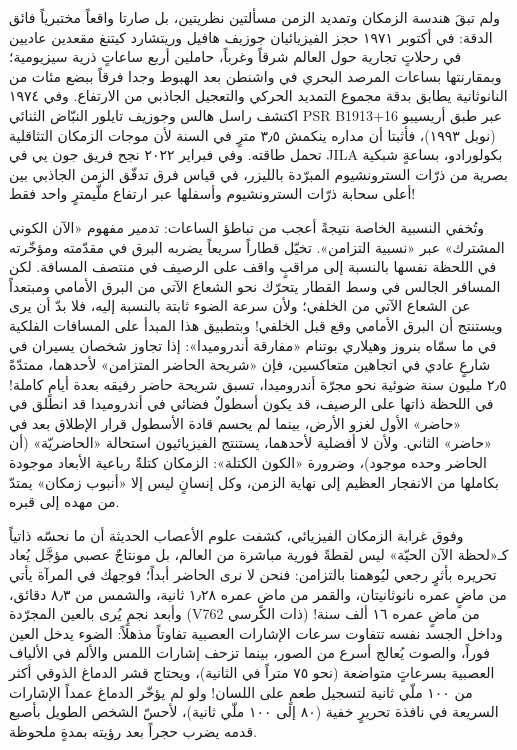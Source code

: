 \documentclass[12pt,a4paper,openany]{book}
\begin{document}
ولم تبقَ هندسة الزمكان وتمديد الزمن مسألتين نظريتين، بل صارتا واقعاً مختبرياً فائق الدقة: في أكتوبر ١٩٧١ حجز الفيزيائيان جوزيف هافيل وريتشارد كيتنغ مقعدين عاديين في رحلاتٍ تجارية حول العالم شرقاً وغرباً، حاملين أربع ساعاتٍ ذرية سيزيومية؛ وبمقارنتها بساعات المرصد البحري في واشنطن بعد الهبوط وجدا فرقاً ببضع مئات من النانوثانية يطابق بدقة مجموع التمديد الحركي والتعجيل الجاذبي من الارتفاع. وفي ١٩٧٤ اكتشف راسل هالس وجوزيف تايلور النبّاض الثنائي PSR B1913+16 عبر طبق أريسيبو (نوبل ١٩٩٣)، فأثبتا أن مداره ينكمش ٣٫٥ مترٍ في السنة لأن موجات الزمكان التثاقلية تحمل طاقته. وفي فبراير ٢٠٢٢ نجح فريق جون يي في JILA بكولورادو، بساعةٍ شبكية بصرية من ذرّات السترونشيوم المبرّدة بالليزر، في قياس فرق تدفّق الزمن الجاذبي بين أعلى سحابة ذرّات السترونشيوم وأسفلها عبر ارتفاع ملّيمترٍ واحد فقط!


وتُخفي النسبية الخاصة نتيجةً أعجب من تباطؤ الساعات: تدمير مفهوم «الآن الكوني المشترك» عبر «نسبية التزامن». تخيّل قطاراً سريعاً يضربه البرق في مقدّمته ومؤخّرته في اللحظة نفسها بالنسبة إلى مراقبٍ واقف على الرصيف في منتصف المسافة. لكن المسافر الجالس في وسط القطار يتحرّك نحو الشعاع الآتي من البرق الأمامي ومبتعداً عن الشعاع الآتي من الخلفي؛ ولأن سرعة الضوء ثابتة بالنسبة إليه، فلا بدّ أن يرى ويستنتج أن البرق الأمامي وقع قبل الخلفي! وبتطبيق هذا المبدأ على المسافات الفلكية في ما سمّاه بنروز وهيلاري بوتنام «مفارقة أندروميدا»: إذا تجاوز شخصان يسيران في شارعٍ عادي في اتجاهين متعاكسين، فإن «شريحة الحاضر المتزامن» لأحدهما، ممتدّةً ٢٫٥ مليون سنة ضوئية نحو مجرّة أندروميدا، تسبق شريحة حاضر رفيقه بعدة أيامٍ كاملة! في اللحظة ذاتها على الرصيف، قد يكون أسطولٌ فضائي في أندروميدا قد انطلق في «حاضر» الأول لغزو الأرض، بينما لم يحسم قادة الأسطول قرار الإطلاق بعد في «حاضر» الثاني. ولأن لا أفضلية لأحدهما، يستنتج الفيزيائيون استحالة «الحاضريّة» (أن الحاضر وحده موجود)، وضرورة «الكون الكتلة»: الزمكان كتلةٌ رباعية الأبعاد موجودة بكاملها من الانفجار العظيم إلى نهاية الزمن، وكل إنسانٍ ليس إلا «أنبوب زمكان» يمتدّ من مهده إلى قبره.


وفوق غرابة الزمكان الفيزيائي، كشفت علوم الأعصاب الحديثة أن ما نحسّه ذاتياً كـ«لحظة الآن الحيّة» ليس لقطةً فورية مباشرة من العالم، بل مونتاجٌ عصبي مؤجَّل يُعاد تحريره بأثرٍ رجعي ليُوهمنا بالتزامن: فنحن لا نرى الحاضر أبداً؛ فوجهك في المرآة يأتي من ماضٍ عمره نانوثانيتان، والقمر من ماضٍ عمره ١٫٢٨ ثانية، والشمس من ٨٫٣ دقائق، وأبعد نجمٍ يُرى بالعين المجرّدة (V762 ذات الكرسي) من ماضٍ عمره ١٦ ألف سنة! وداخل الجسد نفسه تتفاوت سرعات الإشارات العصبية تفاوتاً مذهلاً: الضوء يدخل العين فوراً، والصوت يُعالج أسرع من الصور، بينما تزحف إشارات اللمس والألم في الألياف العصبية بسرعاتٍ متواضعة (نحو ٧٥ متراً في الثانية)، ويحتاج قشر الدماغ الذوقي أكثر من ١٠٠ ملّي ثانية لتسجيل طعمٍ على اللسان! ولو لم يؤخّر الدماغ عمداً الإشارات السريعة في نافذة تحريرٍ خفية (٨٠ إلى ١٠٠ ملّي ثانية)، لأحسّ الشخص الطويل بأصبع قدمه يضرب حجراً بعد رؤيته بمدةٍ ملحوظة.
\end{document}
